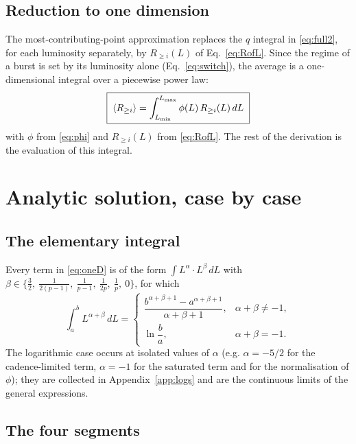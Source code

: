 \documentclass[11pt,a4paper]{article}
\newcommand{\Ravg}{\langle R_{\geq i}\rangle}
\newcommand{\Lmin}{L_{\rm min}}
\newcommand{\Lmax}{L_{\rm max}}
\begin{document}
\subsection{Reduction to one dimension}

The most-contributing-point approximation replaces the $q$ integral in \eqref{eq:full2}, for each luminosity separately, by $R_{\geq i}(L)$ of Eq.~\eqref{eq:RofL}. Since the regime of a burst is set by its luminosity alone (Eq.~\eqref{eq:switch}), the average is a one-dimensional integral over a piecewise power law:
\begin{equation}
\label{eq:oneD}
\boxed{\;\Ravg=\int_{\Lmin}^{\Lmax}\phi(L)\,R_{\geq i}(L)\,dL\;}
\end{equation}
with $\phi$ from \eqref{eq:phi} and $R_{\geq i}(L)$ from \eqref{eq:RofL}. The rest of the derivation is the evaluation of this integral.

\section{Analytic solution, case by case}
\label{sec:solution}

\subsection{The elementary integral}

Every term in \eqref{eq:oneD} is of the form $\int L^{\alpha}\cdot L^{\beta}\,dL$ with $\beta\in\{\tfrac32,\ \tfrac{1}{2(p-1)},\ \tfrac1{p-1},\ \tfrac1{2p},\ \tfrac1p,\ 0\}$, for which
\begin{equation}
\label{eq:elem}
\int_a^b L^{\alpha+\beta}\,dL=\begin{cases}\dfrac{b^{\alpha+\beta+1}-a^{\alpha+\beta+1}}{\alpha+\beta+1}, & \alpha+\beta\neq-1,\\[8pt] \ln\dfrac{b}{a}, & \alpha+\beta=-1 .\end{cases}
\end{equation}
The logarithmic case occurs at isolated values of $\alpha$ (e.g. $\alpha=-5/2$ for the cadence-limited term, $\alpha=-1$ for the saturated term and for the normalisation of $\phi$); they are collected in Appendix~\ref{app:logs} and are the continuous limits of the general expressions.

\subsection{The four segments}
\label{sec:segments}
\end{document}
